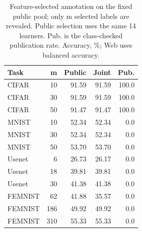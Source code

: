 \begin{table}[t]
\caption{Feature-selected annotation on the fixed public pool; only m selected labels are revealed. Public selection uses the same 14 learners. Pub. is the class-checked publication rate. Accuracy, \%; Web uses balanced accuracy.}
\label{tab:geometry-labels}\small
\centering
\begin{tabular}{@{}lrrrr@{}}\toprule
Task & m & Public & Joint & Pub. \\
\midrule
CIFAR & 10 & 91.59 & 91.59 & 100.0 \\
CIFAR & 30 & 91.59 & 91.59 & 100.0 \\
CIFAR & 50 & 91.47 & 91.47 & 100.0 \\
MNIST & 10 & 52.34 & 52.34 & 0.0 \\
MNIST & 30 & 52.34 & 52.34 & 0.0 \\
MNIST & 50 & 53.70 & 53.70 & 0.0 \\
Usenet & 6 & 26.73 & 26.17 & 0.0 \\
Usenet & 18 & 39.81 & 39.81 & 0.0 \\
Usenet & 30 & 41.38 & 41.38 & 0.0 \\
FEMNIST & 62 & 41.88 & 35.57 & 0.0 \\
FEMNIST & 186 & 49.92 & 49.92 & 0.0 \\
FEMNIST & 310 & 55.33 & 55.33 & 0.0 \\
\bottomrule\end{tabular}
\end{table}
